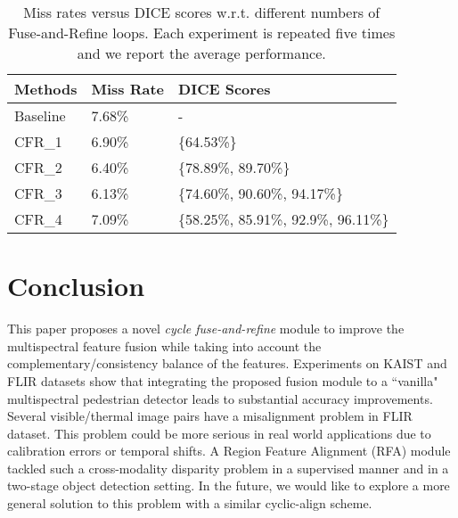 \documentclass{article}
\begin{document}
\begin{table}[h!]
\centering
\begin{tabular}{lll}
\hline
Methods & Miss Rate & DICE Scores \\ \hline
Baseline & 7.68\% & - \\
CFR\_1 & 6.90\% & \{64.53\%\} \\
CFR\_2 & 6.40\% & \{78.89\%, 89.70\%\} \\
CFR\_3 & 6.13\% & \{74.60\%, 90.60\%, 94.17\%\} \\
CFR\_4 & 7.09\% & \{58.25\%, 85.91\%, 92.9\%, 96.11\%\} \\ \hline
\end{tabular}
\caption{Miss rates versus DICE scores w.r.t. different numbers of Fuse-and-Refine loops. Each experiment is repeated five times and we report the average performance.}
\label{tab:ablation}
\end{table} 
\section{Conclusion}
\label{sec:conclusion}
This paper proposes a novel \textit{cycle fuse-and-refine} module to improve the multispectral feature fusion while taking into account the complementary/consistency balance of the features. Experiments on KAIST \cite{KAIST} and FLIR \cite{Flir} datasets show that integrating the proposed fusion module to a ``vanilla" multispectral pedestrian detector leads to substantial accuracy improvements.
Several visible/thermal image pairs have a misalignment problem in FLIR dataset. This problem could be more serious in real world applications due to calibration errors or temporal shifts. A Region Feature Alignment (RFA) module \cite{Disparity} tackled such a cross-modality disparity problem in a supervised manner and in a two-stage object detection setting. In the future, we would like to explore a more general solution to this problem with a similar cyclic-align scheme.
\clearpage
 


\end{document}
